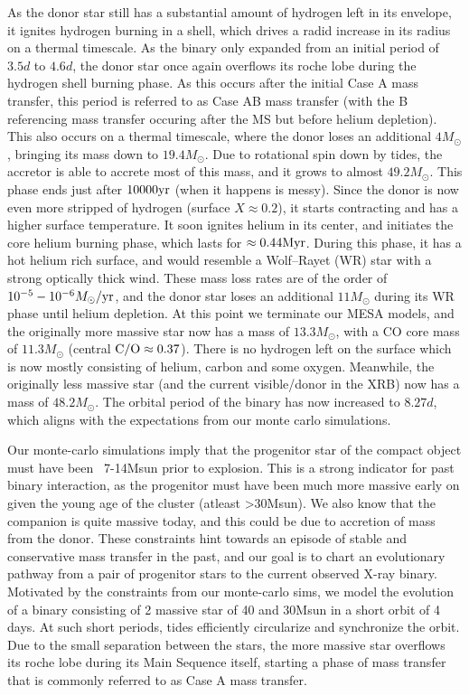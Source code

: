 \documentclass[linenumbers,trackchanges,twocolumn]{aastex701}
\begin{document}
As the donor star still has a substantial amount of hydrogen left in its envelope, it ignites hydrogen burning in a shell, which drives a radid increase in its radius on a thermal timescale. As the binary only expanded from an initial period of $3.5d$ to $4.6d$, the donor star once again overflows its roche lobe during the hydrogen shell burning phase. As this occurs after the initial Case A mass transfer, this period is referred to as Case AB mass transfer (with the B referencing mass transfer occuring after the MS but before helium depletion). This also occurs on a thermal timescale, where the donor loses an additional $4M_{\odot}$, bringing its mass down to $19.4M_{\odot}$. Due to rotational spin down by tides, the accretor is able to accrete most of this mass, and it grows to almost $49.2M_{\odot}$. This phase ends just after $10000 \rm yr$ (when it happens is messy).  Since the donor is now even more stripped of hydrogen (surface $X \approx 0.2$), it starts contracting and has a higher surface temperature. It soon ignites helium in its center, and initiates the core helium burning phase, which lasts for $\approx 0.44 \rm Myr$. During this phase, it has a hot helium rich surface, and would resemble a Wolf--Rayet (WR) star with a strong optically thick wind. These mass loss rates are of the order of $10^{-5} - 10^{-6} M_{\odot}/\rm yr$, and the donor star loses an additional $11M_{\odot}$ during its WR phase until helium depletion. At this point we terminate our MESA models, and the originally more massive star now has a mass of $13.3M_{\odot}$, with a CO core mass of $11.3M_{\odot}$ (central $\rm C/O \approx 0.37$). There is no hydrogen left on the surface which is now mostly consisting of helium, carbon and some oxygen. Meanwhile, the originally less massive star (and the current visible/donor in the XRB) now has a mass of $48.2M_{\odot}$. The orbital period of the binary has now increased to $8.27d$, which aligns with the expectations from our monte carlo simulations.

Our monte-carlo simulations imply that the progenitor star of the compact object must have been ~7-14Msun prior to explosion. This is a strong indicator for past binary interaction, as the progenitor must have been much more massive early on given the young age of the cluster (atleast >30Msun). We also know that the companion is quite massive today, and this could be due to accretion of mass from the donor. These constraints hint towards an episode of stable and conservative mass transfer in the past, and our goal is to chart an evolutionary pathway from a pair of progenitor stars to the current observed X-ray binary. Motivated by the constraints from our monte-carlo sims, we model the evolution of a binary consisting of 2 massive star of 40 and 30Msun in a short orbit of 4 days. At such short periods, tides efficiently circularize and synchronize the orbit. Due to the small separation between the stars, the more massive star overflows its roche lobe during its Main Sequence itself, starting a phase of mass transfer that is commonly referred to as Case A mass transfer. 
\end{document}
